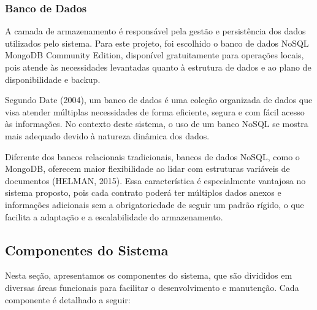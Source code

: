\documentclass[../main.tex]{subfiles}
\begin{document}
\subsubsection{Banco de Dados} A camada de armazenamento é responsável pela gestão e persistência dos dados 
utilizados pelo sistema. Para este projeto, foi escolhido o banco de dados NoSQL MongoDB Community Edition, 
disponível gratuitamente para operações locais, pois atende às necessidades levantadas quanto à estrutura de 
dados e ao plano de disponibilidade e backup.

Segundo Date (2004), um banco de dados é uma coleção organizada de dados que visa atender múltiplas necessidades 
de forma eficiente, segura e com fácil acesso às informações. No contexto deste sistema, o uso de um banco NoSQL 
se mostra mais adequado devido à natureza dinâmica dos dados.

Diferente dos bancos relacionais tradicionais, bancos de dados NoSQL, como o MongoDB, oferecem maior 
flexibilidade ao lidar com estruturas variáveis de documentos (HELMAN, 2015). Essa característica é especialmente 
vantajosa no sistema proposto, pois cada contrato poderá ter múltiplos dados anexos e informações adicionais sem a 
obrigatoriedade de seguir um padrão rígido, o que facilita a adaptação e a escalabilidade do armazenamento.
\subsection{Componentes do Sistema}

Nesta seção, apresentamos os componentes do sistema, que são divididos em diversas áreas funcionais para facilitar o desenvolvimento e manutenção. Cada componente é detalhado a seguir:
\end{document}
